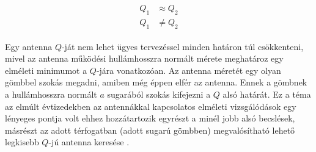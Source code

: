 		\begin{align}
			\begin{split}
				Q_1 & \approx Q_2 \\
				Q_1 & \neq Q_2
			\end{split}
		\end{align}
		\par Egy antenna $Q$-ját nem lehet ügyes tervezéssel minden határon túl csökkenteni, mivel az antenna működési hullámhosszra normált mérete meghatároz egy elméleti minimumot a $Q$-jára vonatkozóan. Az antenna méretét egy olyan gömbbel szokás megadni, amiben még éppen elfér az antenna. Ennek a gömbnek a hullámhosszra normált $a$ sugarából szokás kifejezni a $Q$ alsó határát. Ez a téma az elmúlt évtizedekben az antennákkal kapcsolatos elméleti vizsgálódások egy lényeges pontja volt ehhez hozzátartozik egyrészt a minél jobb alsó becslések, másrészt az adott térfogatban (adott sugarú gömbben) megvalósítható lehető legkisebb $Q$-jú antenna keresése \cite{msa}.
